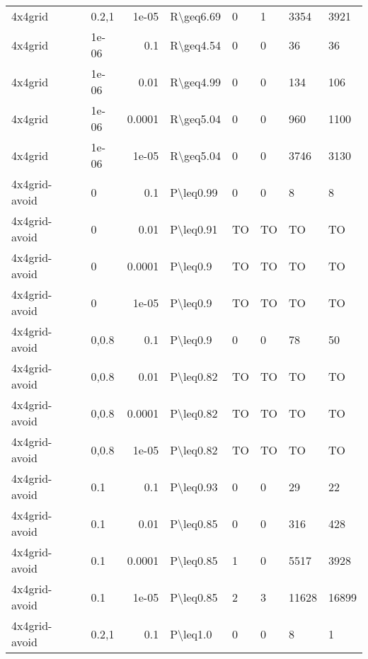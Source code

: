 \begin{longtable}{lllrlllll}
 4x4grid       &           & 0.2,1 & 1e-05  & R\textbackslash{}geq6.69  & 0    & 1    & 3354     & 3921    \\
 4x4grid       &           & 1e-06 & 0.1    & R\textbackslash{}geq4.54  & 0    & 0    & 36       & 36      \\
 4x4grid       &           & 1e-06 & 0.01   & R\textbackslash{}geq4.99  & 0    & 0    & 134      & 106     \\
 4x4grid       &           & 1e-06 & 0.0001 & R\textbackslash{}geq5.04  & 0    & 0    & 960      & 1100    \\
 4x4grid       &           & 1e-06 & 1e-05  & R\textbackslash{}geq5.04  & 0    & 0    & 3746     & 3130    \\
 4x4grid-avoid &           & 0     & 0.1    & P\textbackslash{}leq0.99  & 0    & 0    & 8        & 8       \\
 4x4grid-avoid &           & 0     & 0.01   & P\textbackslash{}leq0.91  & TO   & TO   & TO       & TO      \\
 4x4grid-avoid &           & 0     & 0.0001 & P\textbackslash{}leq0.9   & TO   & TO   & TO       & TO      \\
 4x4grid-avoid &           & 0     & 1e-05  & P\textbackslash{}leq0.9   & TO   & TO   & TO       & TO      \\
 4x4grid-avoid &           & 0,0.8 & 0.1    & P\textbackslash{}leq0.9   & 0    & 0    & 78       & 50      \\
 4x4grid-avoid &           & 0,0.8 & 0.01   & P\textbackslash{}leq0.82  & TO   & TO   & TO       & TO      \\
 4x4grid-avoid &           & 0,0.8 & 0.0001 & P\textbackslash{}leq0.82  & TO   & TO   & TO       & TO      \\
 4x4grid-avoid &           & 0,0.8 & 1e-05  & P\textbackslash{}leq0.82  & TO   & TO   & TO       & TO      \\
 4x4grid-avoid &           & 0.1   & 0.1    & P\textbackslash{}leq0.93  & 0    & 0    & 29       & 22      \\
 4x4grid-avoid &           & 0.1   & 0.01   & P\textbackslash{}leq0.85  & 0    & 0    & 316      & 428     \\
 4x4grid-avoid &           & 0.1   & 0.0001 & P\textbackslash{}leq0.85  & 1    & 0    & 5517     & 3928    \\
 4x4grid-avoid &           & 0.1   & 1e-05  & P\textbackslash{}leq0.85  & 2    & 3    & 11628    & 16899   \\
 4x4grid-avoid &           & 0.2,1 & 0.1    & P\textbackslash{}leq1.0   & 0    & 0    & 8        & 1       \\

\end{longtable}
